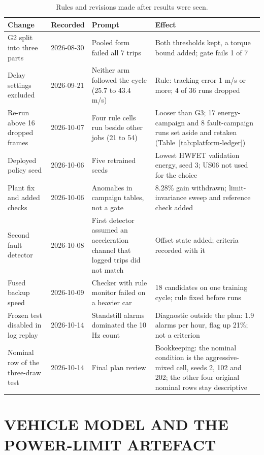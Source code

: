 \documentclass{ieeeaccess}
\begin{document}
\begin{table}[!t]
\centering
\caption{Rules and revisions made after results were seen.}
\label{tab:platform-revisions}
\footnotesize
\setlength{\tabcolsep}{3pt}
\renewcommand{\arraystretch}{1.15}
\begin{tabularx}{\textwidth}{@{}XXXX@{}}
\hline
\textbf{Change} & \textbf{Recorded} & \textbf{Prompt} & \textbf{Effect} \\
\hline
G2 split into three parts & 2026-08-30 & Pooled form failed all 7 trips & Both thresholds kept, a torque bound added; gate fails 1 of 7 \\
Delay settings excluded & 2026-09-21 & Neither arm followed the cycle (25.7 to 43.4 m/s) & Rule: tracking error 1 m/s or more; 4 of 36 runs dropped \\
Re-run above 16 dropped frames & 2026-10-07 & Four rule cells run beside other jobs (21 to 54) & Looser than G3; 17 energy-campaign and 8 fault-campaign runs set aside and retaken (Table~\ref{tab:platform-ledger}) \\
Deployed policy seed & 2026-10-06 & Five retrained seeds & Lowest HWFET validation energy, seed 3; US06 not used for the choice \\
Plant fix and added checks & 2026-10-06 & Anomalies in campaign tables, not a gate & 8.28\% gain withdrawn; limit-invariance sweep and reference check added \\
Second fault detector & 2026-10-08 & First detector assumed an acceleration channel that logged trips did not match & Offset state added; criteria recorded with it \\
Fused backup speed & 2026-10-09 & Checker with rule monitor failed on a heavier car & 18 candidates on one training cycle; rule fixed before runs \\
Frozen test disabled in log replay & 2026-10-14 & Standstill alarms dominated the 10 Hz count & Diagnostic outside the plan: 1.9 alarms per hour, flag up 21\%; not a criterion \\
Nominal row of the three-draw test & 2026-10-14 & Final plan review & Bookkeeping: the nominal condition is the aggressive-mixed cell, seeds 2, 102 and 202; the other four original nominal rows stay descriptive \\
\hline
\end{tabularx}
\end{table}

\section{VEHICLE MODEL AND THE POWER-LIMIT ARTEFACT}
\label{sec:plant}
\end{document}
